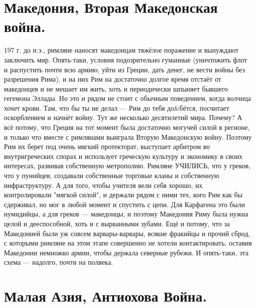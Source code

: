 \section{Македония, Вторая Македонская война.}

197 г. до н.э., римляне наносят македонцам тяжёлое поражение и вынуждают заключить мир. Опять-таки, условия подозрительно гуманные (уничтожить флот и распустить почти всю армию, уйти из Греции, дать денег, не вести войны без разрешения Рима), и на них Рим на достаточно долгое время отстаёт от македонцев и не мешает им жить, хоть и периодически шпыняет бывшего гегемона Эллады. Но это и рядом не стоит с обычным поведением, когда волчица хочет крови. Там, что бы ты не делал — Рим до тебя до\&бётся, посчитает оскорблением и начнёт войну. Тут же несколько десятилетий мира. Почему? А всё потому, что Греция на тот момент была достаточно могучей силой в регионе, и только что вместе с римлянами выиграла Вторую Македонскую войну. Поэтому Рим их берет под очень мягкий протекторат, выступает арбитром во внутригреческих спорах и использует греческую культуру и экономику в своих интересах, развивая собственную метрополию. Римляне УЧИЛИСЬ, что у греков, что у пунийцев, создавали собственные торговые кланы и собственную инфраструктуру. А для того, чтобы учителя вели себя хорошо, их контролировали "мягкой силой", и держали рядом с ними тех, кого Рим как бы сдерживал, но мог в любой момент и спустить с цепи. Для Карфагена это были нумидийцы, а для греков — македонцы, и поэтому Македония Риму была нужна целой и дееспособной, хоть и с вырванными зубами. Ещё и потому, что за Македонией были уж совсем варвары-варвары, всякие фракийцы и прочий сброд, с которыми римляне на этом этапе совершенно не хотели контактировать, оставив Македонии немножко армии, чтобы держала северные рубежи. И опять-таки, эта схема — надолго, почти на полвека.




\section{Малая Азия, Антиохова Война.}

